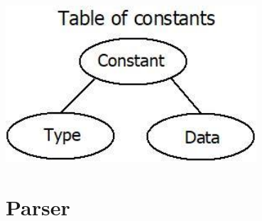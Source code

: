 \documentclass[10pt,a4paper,titlepage]{article}
\begin{document}
\begin{center}
  \includegraphics[width=0.7\textwidth]{img/TableOfConstans.jpg}
\end{center}

\newpage

\section{Parser}
\end{document}
